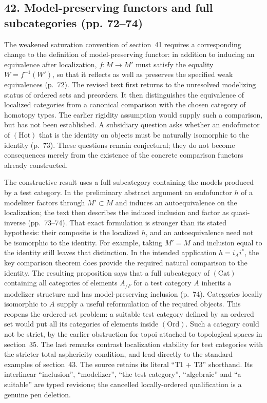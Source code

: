 \subsection*{42. Model-preserving functors and full subcategories (pp. 72--74)}
The weakened saturation convention of section~41 requires a corresponding change to the definition of model-preserving functor: in addition to inducing an equivalence after localization, $f:M\to M'$ must satisfy the equality $W=f^{-1}(W')$, so that it reflects as well as preserves the specified weak equivalences (p.~72). The revised text first returns to the unresolved modelizing status of ordered sets and preorders. It then distinguishes the equivalence of localized categories from a canonical comparison with the chosen category of homotopy types. The earlier rigidity assumption would supply such a comparison, but has not been established. A subsidiary question asks whether an endofunctor of $(\mathrm{Hot})$ that is the identity on objects must be naturally isomorphic to the identity (p.~73). These questions remain conjectural; they do not become consequences merely from the existence of the concrete comparison functors already constructed.

The constructive result uses a full subcategory containing the models produced by a test category. In the preliminary abstract argument an endofunctor $h$ of a modelizer factors through $M'\subset M$ and induces an autoequivalence on the localization; the text then describes the induced inclusion and factor as quasi-inverse (pp.~73--74). That exact formulation is stronger than its stated hypothesis: their composite is the localized $h$, and an autoequivalence need not be isomorphic to the identity. For example, taking $M'=M$ and inclusion equal to the identity still leaves that distinction. In the intended application $h=i_Ai^*$, the key comparison theorem does provide the required natural comparison to the identity. The resulting proposition says that a full subcategory of $(\mathrm{Cat})$ containing all categories of elements $A_{/F}$ for a test category $A$ inherits a modelizer structure and has model-preserving inclusion (p.~74). Categories locally isomorphic to $A$ supply a useful reformulation of the required objects. This reopens the ordered-set problem: a suitable test category defined by an ordered set would put all its categories of elements inside $(\mathrm{Ord})$. Such a category could not be strict, by the earlier obstruction for topoi attached to topological spaces in section~35. The last remarks contrast localization stability for test categories with the stricter total-asphericity condition, and lead directly to the standard examples of section~43. The source retains its literal ``T1 + T3'' shorthand. Its interlinear ``inclusion'', ``modelizer'', ``the test category'', ``algebraic'' and ``a suitable'' are typed revisions; the cancelled locally-ordered qualification is a genuine pen deletion.


